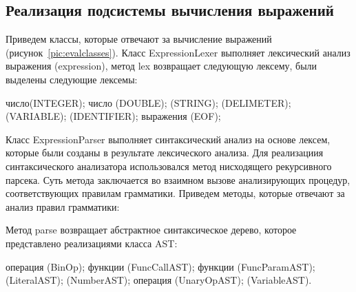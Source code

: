 \documentclass[14pt,a4paper]{reportmod}
\begin{document}
\subsection{Реализация подсистемы вычисления выражений}

Приведем классы, которые отвечают за вычисление выражений (рисунок~\ref{pic:evalclasses}). Класс ExpressionLexer выполняет лексический анализ выражения (expression), метод lex возвращает следующую лексему, были выделены следующие лексемы:

\begin{itemize}
   число(INTEGER);
   число (DOUBLE);
   (STRING);
   (DELIMETER);
   (VARIABLE);
   (IDENTIFIER);
   выражения (EOF);
\end{itemize}

Класс ExpressionParser выполняет синтаксический анализ на основе лексем, которые были созданы в результате лексического анализа. Для реализациия синтаксического анализатора использовался метод нисходящего рекурсивного парсека. Суть метода заключается во взаимном вызове анализирующих процедур, соответствующих правилам грамматики. Приведем методы, которые отвечают за анализ правил грамматики:

\begin{gostitemize}
\end{gostitemize}
Метод parse возвращает абстрактное синтаксическое дерево, которое представлено реализациями класса AST:

\begin{itemize}
   операция (BinOp);
   функции (FuncCallAST);
   функции (FuncParamAST);
   (LiteralAST);
   (NumberAST);
   операция (UnaryOpAST);
   (VariableAST).
\end{itemize}
\end{document}
